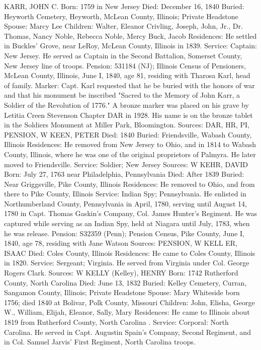 KARR, JOHN C.
Born: 1759 in New Jersey
Died: December 16, 1840
Buried: Heyworth Cemetery, Heyworth, McLean County, Illinois; Private Headstone
Spouse: Marcy Lee
Children: Walter, Eleanor Crivling, Joseph, John, Jr., Dr. Thomas, Nancy Noble, 
Rebecca Noble, Mercy Buck, Jacob 
Residences: He settled in Buckles' Grove, near LeRoy, McLean County, Illinois in 1839.
Service: Captain: New Jersey. He served as Captain in the Second Battalion, Somerset County, New Jersey line of troops. Pension: 531184 (NJ); Illinois Census of Pensioners, McLean County, Illinois, June I, 1840, age 81, residing with Tharosa Karl, head of family. 
Marker: Capt. Karl requested that he be buried with the honors of war and that his monument be inscribed "Sacred to the Memory of John Karr, a Soldier of the Revolution of 1776." A bronze marker was placed on his grave by Letitia Creen Stevenson Chapter DAR in 1928. His name is on the bronze tablet in the Soldiers Monument at Miller Park, Bloomington. 
Sources: DAR, HR, PI, PENSION, W 
KEEN, PETER 
Died: 1840
Buried: Friendsville, Wabash County, Illinois
Residences: He removed from New Jersey to Ohio, and in 1814 to Wabash County, Illinois, where he was one of the original proprietors of Palmyra. He later moved to Friendsville.
Service: Soldier; New Jersey Sources: W 
KEHR, DAVID
Born: July 27, 1763 near Philadelphia, Pennsylvania
Died: After 1839
Buried: Near Griggsville, Pike County, Illinois
Residences: He removed to Ohio, and from there to Pike County, Illinois
Service: Indian Spy; Pennsylvania. He enlisted in Northumberland County, Pennsylvania in April, 1780, serving until August 14, 1780 in Capt. Thomas Gaskin's Company, Col. James Hunter's Regiment. He was captured while serving as an Indian Spy, held at Niagara until July, 1783, when he was release. 
Pension: S32359 (Penn); Pension Census, Pike County, June I, 1840, age 78, residing with Jane Watson
Sources: PENSION, W 
KELL ER, ISAAC
Died: Coles County, Illinois
Residences: He came to Coles County, Illinois in 1820.
Service: Sergeant; Virginia. He served from Virginia under Col. George Rogers Clark. 
Sources: W 
KELLY (Kelley), HENRY 
Born: 1742 Rutherford County, North Carolina 
Died: June 13, 1832 
Buried: Kelley Cemetery, Curran, Sangamon County, Illinois; Private Headstone 
Spouse: Mary Whiteside born 1756; died 1840 at Bolivar, Polk County, Missouri 
Children: John, Elisha, George W., William, Elijah, Eleanor, Sally, Mary 
Residences: He came to Illinois about 1819 from Rutherford County, North Carolina .
Service: Corporal: North Carolina. He served in Capt. Augustin Spain's Company, Second Regiment, and in Col. Samuel Jarvis' First Regiment, North Carolina troops.
